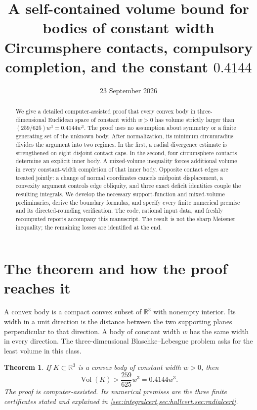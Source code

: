 \documentclass[11pt]{article}
\title{\Large\bfseries A self-contained volume bound for bodies of constant width\\[5pt]
\large Circumsphere contacts, compulsory completion, and the constant \(0.4144\)}
\author{}
\date{23 September 2026}
\numberwithin{equation}{section}
\newtheorem{theorem}{Theorem}[section]
\theoremstyle{definition}\newtheorem{definition}[theorem]{Definition}
\theoremstyle{remark}\newtheorem{remark}[theorem]{Remark}
\newcommand{\R}{\mathbb R}
\newcommand{\Vol}{\operatorname{Vol}}
\begin{document}
\maketitle
\begin{abstract}
We give a detailed computer-assisted proof that every convex body in
three-dimensional Euclidean space of constant width $w>0$ has volume strictly
larger than $(259/625)w^3=0.4144w^3$. The proof uses no assumption about
symmetry or a finite generating set of the unknown body. After normalization,
its minimum circumradius divides the argument into two regimes. In the first,
a radial divergence estimate is strengthened on eight disjoint contact caps.
In the second, four circumsphere contacts determine an explicit inner body.
A mixed-volume inequality forces additional volume in every constant-width
completion of that inner body. Opposite contact edges are treated jointly:
a change of normal coordinates cancels midpoint displacement, a convexity
argument controls edge obliquity, and three exact deficit identities couple
the resulting integrals. We develop the necessary support-function and
mixed-volume preliminaries, derive the boundary formulas, and specify every
finite numerical premise and its directed-rounding verification. The code,
rational input data, and freshly recomputed reports accompany this manuscript.
The result is not the sharp Meissner inequality; the remaining losses are
identified at the end.
\end{abstract}
\begingroup
\small
\tableofcontents
\endgroup
\newpage

\section{The theorem and how the proof reaches it}\label{sec:intro}
A convex body is a compact convex subset of $\R^3$ with nonempty interior.
Its width in a unit direction is the distance between the two supporting
planes perpendicular to that direction. A body of constant width $w$ has the
same width in every direction. The three-dimensional Blaschke--Lebesgue
problem asks for the least volume in this class.

\begin{theorem}\label{thm:main}
If $K\subset\R^3$ is a convex body of constant width $w>0$, then
\begin{equation}\label{eq:main}
 \boxed{\Vol(K)>\frac{259}{625}w^3=0.4144w^3.}
\end{equation}
The proof is computer-assisted. Its numerical premises are the three finite
certificates stated and explained in \cref{sec:integralcert,sec:hullcert,sec:radialcert}.
\end{theorem}
\end{document}
